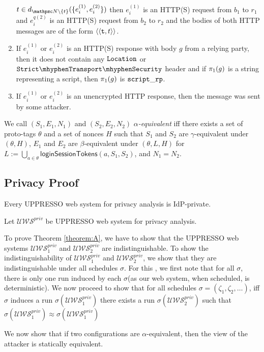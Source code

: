 \begin{definition}
\begin{enumerate}
        $t \in d_{\nonces\setminus\{t\}}(\{e_i^{(1)}, e_i^{(2)}\})$ 
        then $e_i^{(1)}$ is an HTTP(S) request from $b_1$ to $r_1$ 
        and $e_i^{q(2)}$ is an HTTP(S) request from $b_2$ to $r_2$ 
        and the bodies of both HTTP messages are of the form
        $\langle\langle\mathtt{t}, t\rangle\rangle$.
      \item\label{eqe:pre:rp-scripts} If $e_i^{(1)}$ or $e_i^{(2)}$ is an
        HTTP(S) response with body $g$ from a relying party, then it does
        not contain any $\mathtt{Location}$ or $\cSTS$ header
        and if $\pi_{1}({g})$ is a string representing a script, then
        $\pi_{1}({g})$ is $\mathtt{script\_rp}$.
      \item\label{eqe:pre:unencrypted-http} If $e_i^{(1)}$ or $e_i^{(2)}$
        is an unencrypted HTTP response, then the message was sent by some
        attacker.
    \end{enumerate}
  \end{definition}
  
  \begin{definition}
    We call $(S_1,E_1,N_1)$ and $(S_2,E_2,N_2)$
    \emph{$\alpha$-equivalent} iff there exists a set of proto-tags
    $\theta$ and a set of nonces $H$ such that $S_1$ and $S_2$ are
    $\gamma$-equivalent under $(\theta,H)$, $E_1$ and $E_2$ are
    $\beta$-equivalent under $(\theta,L,H)$ for
    $L := \bigcup_{a\in\theta} \mathsf{loginSessionTokens}(a,S_1,S_2)$,
    and $N_1 = N_2$.
  \end{definition}
  
  \subsection{Privacy Proof}
  
  \begin{theorem} \label{theorem:A}Every UPPRESSO web system for privacy analysis is IdP-private.
  \end{theorem}
  
  Let $\mathcal{U\!W\!S}^{priv}$ be UPPRESSO web system for privacy analysis.\par
  To prove Theorem \ref{theorem:A}, we have to show that the UPPRESSO web systems $\mathcal{U\!W\!S}^{priv}_1$ and $\mathcal{U\!W\!S}^{priv}_2$ 
  are indistinguishable. To show the indistinguishability of $\mathcal{U\!W\!S}^{priv}_1$ and $\mathcal{U\!W\!S}^{priv}_2$, 
  we show that they are indistinguishable under all schedules $\sigma$.
  For this , we first note that for all $\sigma$, there is only one run induced by each $\sigma$(as our web system, when scheduled, is deterministic).
  We now proceed to show that for all schedules $\sigma=(\zeta _1, \zeta_2,\dots)$, iff $\sigma$ induces a run $\sigma(\mathcal{U\!W\!S}^{priv}_1)$ there exists a run $\sigma(\mathcal{U\!W\!S}^{priv}_2)$ such that $\sigma(\mathcal{U\!W\!S}^{priv}_1)\approx\sigma(\mathcal{U\!W\!S}^{priv}_1)$\par
  We now show that if two configurations are $\alpha$-equivalent, then the view of the attacker is statically equivalent.
  
